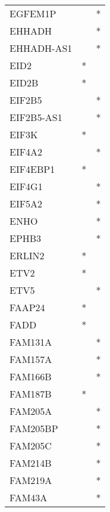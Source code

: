 \begin{longtable}{lcc}
EGFEM1P          &                &          * \\
EHHADH           &                &          * \\
EHHADH-AS1       &                &          * \\
EID2             &              * &            \\
EID2B            &              * &            \\
EIF2B5           &                &          * \\
EIF2B5-AS1       &                &          * \\
EIF3K            &              * &            \\
EIF4A2           &                &          * \\
EIF4EBP1         &              * &            \\
EIF4G1           &                &          * \\
EIF5A2           &                &          * \\
ENHO             &                &          * \\
EPHB3            &                &          * \\
ERLIN2           &              * &            \\
ETV2             &              * &            \\
ETV5             &                &          * \\
FAAP24           &              * &            \\
FADD             &              * &            \\
FAM131A          &                &          * \\
FAM157A          &                &          * \\
FAM166B          &                &          * \\
FAM187B          &              * &            \\
FAM205A          &                &          * \\
FAM205BP         &                &          * \\
FAM205C          &                &          * \\
FAM214B          &                &          * \\
FAM219A          &                &          * \\
FAM43A           &                &          * \\

\end{longtable}
